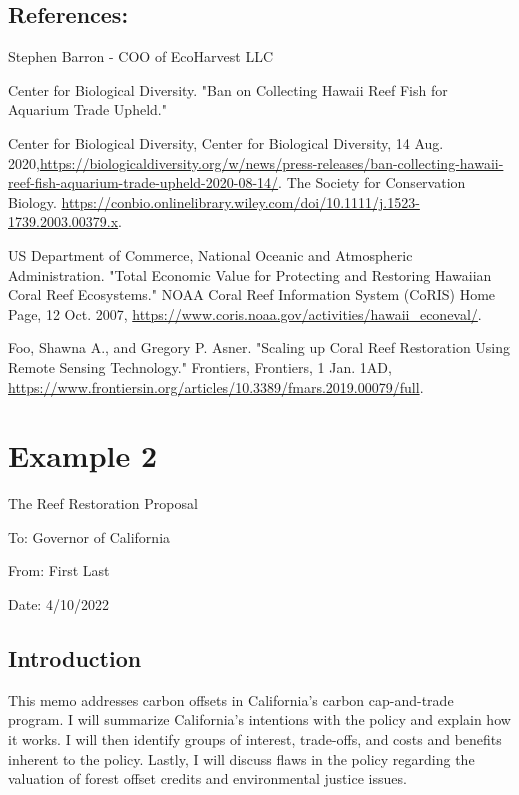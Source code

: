 \documentclass[11pt]{article}
\begin{document}
\subsection*{References:}

\smallskip\noindent Stephen Barron - COO of EcoHarvest LLC

\smallskip\noindent Center for Biological Diversity. "Ban on Collecting Hawaii Reef Fish for Aquarium Trade Upheld."

\smallskip\noindent Center for Biological Diversity, Center for Biological Diversity, 14 Aug. 2020,\url{https://biologicaldiversity.org/w/news/press-releases/ban-collecting-hawaii-reef-fish-aquarium-trade-upheld-2020-08-14/}. The Society for Conservation Biology. \url{https://conbio.onlinelibrary.wiley.com/doi/10.1111/j.1523-1739.2003.00379.x}.

\smallskip\noindent US Department of Commerce, National Oceanic and Atmospheric Administration. "Total Economic Value for Protecting and Restoring Hawaiian Coral Reef Ecosystems." NOAA Coral Reef Information System (CoRIS) Home Page, 12 Oct. 2007, \url{https://www.coris.noaa.gov/activities/hawaii_econeval/}.

\smallskip\noindent Foo, Shawna A., and Gregory P. Asner. "Scaling up Coral Reef Restoration Using Remote Sensing Technology." Frontiers, Frontiers, 1 Jan. 1AD, \url{https://www.frontiersin.org/articles/10.3389/fmars.2019.00079/full}.


\newpage 
\section*{Example 2}

\noindent
The Reef Restoration Proposal

\noindent
To: Governor of California

\noindent
From: First Last

\noindent
Date: 4/10/2022

\subsection*{Introduction}

This memo addresses carbon offsets in California's carbon cap-and-trade program. I will summarize California's intentions with the policy and explain how it works. I will then identify groups of interest, trade-offs, and costs and benefits inherent to the policy. Lastly, I will discuss flaws in the policy regarding the valuation of forest offset credits and environmental justice issues.
\end{document}
